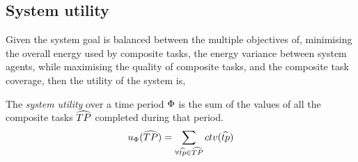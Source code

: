 \subsection{System utility}
\newcommand{\functionSystemUtility}[2]{\functionSignature{u_{\setTime{}{}}}{\setCompositeTask{}{}}}
Given the system goal is balanced between the multiple objectives of, minimising the overall energy used by composite tasks, the energy variance between system agents, while maximising the quality of composite tasks, and the composite task coverage, then the utility of the system is,

\begin{definition}
	The \textit{system utility} over a time period $\Phi$ is the sum of the values of all the composite tasks $\setCompositeTask{}{}$ completed during that period.
	\begin{equation}
		\functionSystemUtility{}{} = \sum_{\forall \varCompositeTask{}{} \in \setCompositeTask{}{}}
		\functionCompositeTaskQuality{}{}
	\end{equation}
\end{definition}

